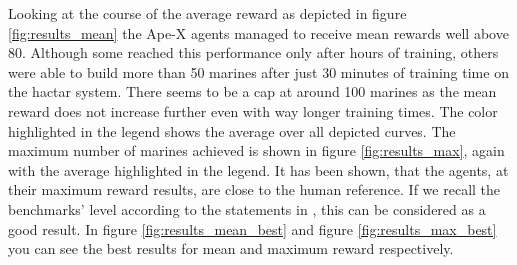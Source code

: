 \documentclass[12pt,a4paper]{article}
\begin{document}
Looking at the course of the average reward as depicted in figure \ref{fig:results_mean} the Ape-X agents managed to receive mean rewards well above 80. Although some reached this performance only after hours of training, others were able to build more than 50 marines after just 30 minutes of training time on the hactar system. There seems to be a cap at around 100 marines as the mean reward does not increase further even with way longer training times. The color highlighted in the legend shows the average over all depicted curves. The maximum number of marines achieved is shown in figure \ref{fig:results_max}, again with the average highlighted in the legend. It has been shown, that the agents, at their maximum reward results, are close to the human reference. If we recall the benchmarks' level according to the statements in \cite{DBLP:journals/corr/abs-1708-04782}, this can be considered as a good result. In figure \ref{fig:results_mean_best} and figure \ref{fig:results_max_best} you can see the best results for mean and maximum reward respectively.
\end{document}
